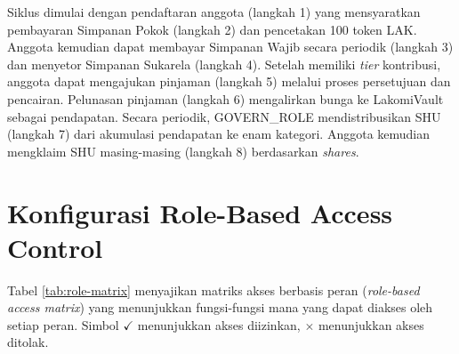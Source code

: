 Siklus dimulai dengan pendaftaran anggota (langkah 1) yang mensyaratkan pembayaran Simpanan Pokok (langkah 2) dan pencetakan 100 token LAK. Anggota kemudian dapat membayar Simpanan Wajib secara periodik (langkah 3) dan menyetor Simpanan Sukarela (langkah 4). Setelah memiliki \textit{tier} kontribusi, anggota dapat mengajukan pinjaman (langkah 5) melalui proses persetujuan dan pencairan. Pelunasan pinjaman (langkah 6) mengalirkan bunga ke LakomiVault sebagai pendapatan. Secara periodik, GOVERN\_ROLE mendistribusikan SHU (langkah 7) dari akumulasi pendapatan ke enam kategori. Anggota kemudian mengklaim SHU masing-masing (langkah 8) berdasarkan \textit{shares}.

\section{Konfigurasi Role-Based Access Control}

Tabel \ref{tab:role-matrix} menyajikan matriks akses berbasis peran (\textit{role-based access matrix}) yang menunjukkan fungsi-fungsi mana yang dapat diakses oleh setiap peran. Simbol $\checkmark$ menunjukkan akses diizinkan, $\times$ menunjukkan akses ditolak.

